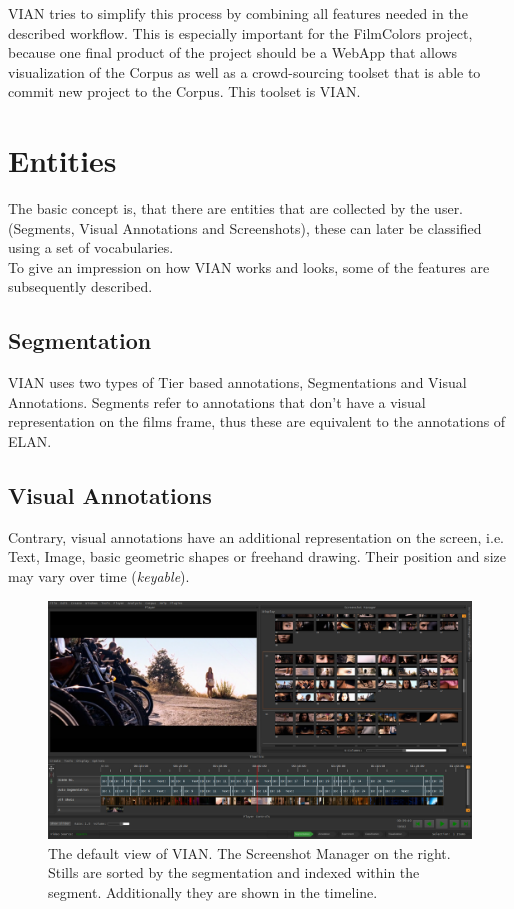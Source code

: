 \documentclass[11pt, a4paper,oneside,chapterprefix=false]{scrbook}
\begin{document}
VIAN tries to simplify this process by combining all features needed in the described workflow. This is especially important for the FilmColors project, because one final product of the project should be a WebApp that allows visualization of the Corpus as well as a crowd-sourcing toolset that is able to commit new project to the Corpus. This toolset is VIAN. 


 
\newpage
\section{Entities} \label{chp:features}

The basic concept is, that there are entities that are collected by the user. (Segments, Visual Annotations and Screenshots), these can later be classified using a set of vocabularies. \\
To give an impression on how VIAN works and looks, some of the features are subsequently described. 

\subsection{Segmentation}
VIAN uses two types of Tier based annotations, Segmentations and Visual Annotations. Segments refer to annotations that don’t have a visual representation on the films frame, thus these are equivalent to the annotations of ELAN. 

\subsection{Visual Annotations}
Contrary, visual annotations have an additional representation on the screen, i.e. Text, Image, basic geometric shapes or freehand drawing. Their position and size may vary over time (\textit{keyable}). 

\begin{figure}[htp]
	\centering
	\includegraphics[width=1.0\textwidth]{figures/vian_segmentation.PNG}
	\caption{The default view of VIAN. The Screenshot Manager on the right. Stills are sorted by the segmentation and indexed within the segment. Additionally they are shown in the timeline. }
	\label{fig:vian_segmentation}
\end{figure}
\end{document}
